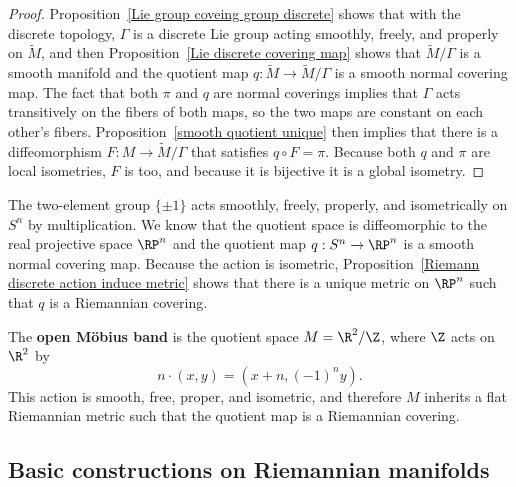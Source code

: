 \begin{proof}
Proposition~\ref{Lie group coveing group discrete} shows that with the discrete 
topology, $\Gamma$ is a discrete Lie group acting smoothly, freely, and properly 
on $\widetilde{M}$, and then Proposition~\ref{Lie discrete covering map} shows 
that $\widetilde{M}/\Gamma$ is a smooth manifold and the quotient map $q:\widetilde{M}\to\widetilde{M}/\Gamma$ 
is a smooth normal covering map. The fact that both $\pi$ and $q$ are normal 
coverings implies that $\Gamma$ acts transitively on the fibers of both maps, so 
the two maps are constant on each other's fibers. Proposition~\ref{smooth quotient unique} 
then implies that there is a diffeomorphism $F:M\to\widetilde{M}/\Gamma$ that 
satisfies $q\circ F=\pi$. Because both $q$ and $\pi$ are local isometries, $F$ is 
too, and because it is bijective it is a global isometry.
\end{proof}
\begin{example}
The two-element group $\{\pm 1\}$ acts smoothly, freely, properly, and isometrically 
on $S^n$ by multiplication. We know that the quotient space is diffeomorphic to 
the real projective space $\RP^n$ and the quotient map $q:S^n\to\RP^n$ is a smooth 
normal covering map. Because the action is isometric, Proposition~\ref{Riemann discrete action induce metric} 
shows that there is a unique metric on $\RP^n$ such that $q$ is a Riemannian covering.
\end{example}
\begin{example}
The \textbf{open M\"obius band} is the quotient space $M=\R^2/\Z$, where $\Z$ acts on $\R^2$ by 
\[n\cdot(x,y)=(x+n,(-1)^ny).\]
This action is smooth, free, proper, and isometric, and therefore $M$ inherits a 
flat Riemannian metric such that the quotient map is a Riemannian covering.
\end{example}
\subsection{Basic constructions on Riemannian manifolds}
